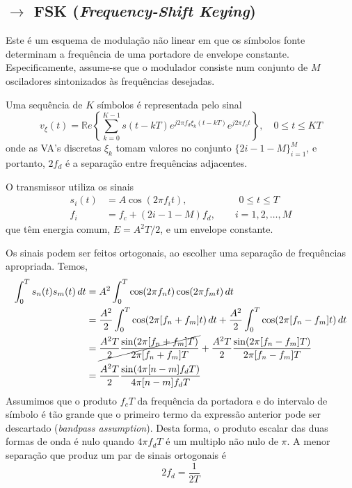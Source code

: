 \clearpage
\subsection[5.4 FSK (\textit{Frequency-Shift Keying})]{$\rightarrow$ FSK (\textit{Frequency-Shift Keying})}
\label{subsec:M-FSK}

\begin{mdframed}
    Este é um esquema de modulação não linear em que os símbolos fonte determinam a frequência de uma portadore de envelope constante. Especificamente, assume-se que o modulador consiste num conjunto de $M$ osciladores sintonizados às frequências desejadas. 

    Uma sequência de $K$ símbolos é representada pelo sinal
    $$
    v_\xi(t) = \mathbb{R}e\left\{ \sum_{k=0}^{K-1} s(t-kT) e^{j2\pi f_d \xi_k(t-kT)} e^{j2\pi f_c t} \right\},\quad 0 \leq t \leq KT
    $$
    onde as VA's discretas $\xi_k$ tomam valores no conjunto $\{2i-1-M\}_{i=1}^{M}$, e portanto, $2f_d$ é a separação entre frequências adjacentes.

    O transmissor utiliza os sinais
    \begin{align*}
        s_i(t) &= A \cos(2\pi f_i t), \qquad\qquad\quad\; 0 \leq t \leq T \\
        f_i &= f_c + (2i-1-M)f_d, \qquad i = 1,2,\dots,M 
    \end{align*}
    que têm energia comum, $E=A^2T/2$, e um envelope constante.

    \vspace{0.75em}
    \noindent Os sinais podem ser feitos ortogonais, ao escolher uma separação de frequências apropriada. Temos,
    \begin{align*}
        \int_{0}^{T} s_n(t) s_m(t)\, dt &= A^2 \int_{0}^{T} \cos(2\pi f_n t) \cos(2\pi f_m t) \, dt \\
        &= \frac{A^2}{2} \int_{0}^{T} \cos(2\pi[f_n + f_m]t)\, dt +  \frac{A^2}{2} \int_{0}^{T} \cos(2\pi[f_n - f_m]t)\, dt \\
        &= \cancel{\frac{A^2 T}{2} \frac{\sin(2\pi [f_n + f_m] T)}{2\pi [f_n + f_m] T}} + \frac{A^2 T}{2} \frac{\sin(2\pi [f_n - f_m] T)}{2\pi [f_n - f_m] T} \\
        &= \frac{A^2 T}{2} \frac{\sin(4\pi [n - m]f_d T)}{4\pi [n - m]f_d T}
    \end{align*}
    Assumimos que o produto $f_c T$ da frequência da portadora e do intervalo de símbolo é tão grande que o primeiro termo da expressão anterior pode ser descartado (\textit{bandpass assumption}). Desta forma, o produto escalar das duas formas de onda é nulo quando $4\pi f_d T$ é um multiplo não nulo de $\pi$. A menor separação que produz um par de sinais ortogonais é
    $$
        2 f_d = \frac{1}{2T}
    $$
\end{mdframed}

